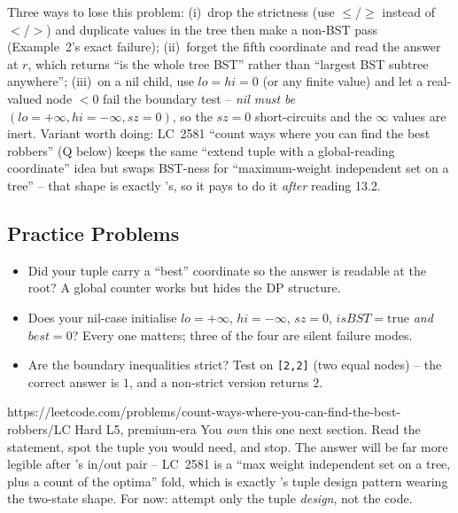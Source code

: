 \begin{warningbox}
Three ways to lose this problem: (i)~drop the strictness (use $\le$/$\ge$
instead of $<$/$>$) and duplicate values in the tree then make a
non-BST pass (Example~2's exact failure); (ii)~forget the fifth
coordinate and read the answer at $r$, which returns ``is the whole tree
BST'' rather than ``largest BST subtree anywhere''; (iii)~on a nil child,
use $\mathit{lo}=\mathit{hi}=0$ (or any finite value) and let a
real-valued node $<0$ fail the boundary test -- \emph{nil must be
$(\mathit{lo}{=}{+}\infty,\mathit{hi}{=}{-}\infty,\mathit{sz}{=}0)$}, so
the $\mathit{sz}{=}0$ short-circuits and the $\infty$ values are inert.
Variant worth doing: LC~2581 ``count ways where you can find the best
robbers'' (Q below) keeps the same ``extend tuple with a global-reading
coordinate'' idea but swaps BST-ness for ``maximum-weight independent
set on a tree'' -- that shape is exactly 's, so it
pays to do it \emph{after} reading 13.2.
\end{warningbox}

\subsection{Practice Problems}

\begin{stuckbox}
\begin{itemize}[nosep, leftmargin=1.4em]
  \item Did your tuple carry a ``best'' coordinate so the answer is
        readable at the root? A global counter works but hides the DP
        structure.
  \item Does your nil-case initialise $\mathit{lo}=+\infty$,
        $\mathit{hi}=-\infty$, $\mathit{sz}=0$, $\mathit{isBST}{=}\text{true}$
        \emph{and} $\mathit{best}=0$? Every one matters; three of the four
        are silent failure modes.
  \item Are the boundary inequalities strict? Test on \texttt{[2,2]} (two
        equal nodes) -- the correct answer is $1$, and a
        non-strict version returns $2$.
\end{itemize}
\end{stuckbox}

\begin{practiceset}
    {https://leetcode.com/problems/count-ways-where-you-can-find-the-best-robbers/}{LC Hard L5, premium-era}
    {You \emph{own} this one next section. Read the statement, spot the
    tuple you would need, and stop. The answer will be far more legible after
    's in/out pair -- LC~2581 is a ``max weight
    independent set on a tree, plus a count of the optima'' fold, which is
    exactly 's tuple design pattern wearing the
    two-state shape. For now: attempt only the tuple \emph{design}, not the
    code.}
\end{practiceset}

